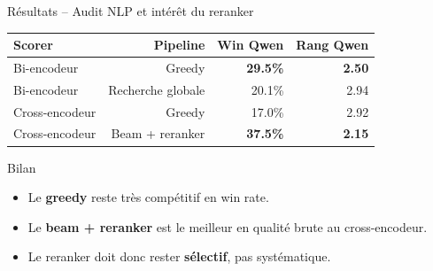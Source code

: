 \documentclass[11pt,aspectratio=169]{beamer}
\begin{document}
\begin{frame}{Résultats -- Audit NLP et intérêt du reranker}
\small
\begin{table}
\centering
\renewcommand{\arraystretch}{1.15}
\begin{tabular}{lrrr}
\toprule
\textbf{Scorer} & \textbf{Pipeline} & \textbf{Win Qwen} & \textbf{Rang Qwen} \\
\midrule
Bi-encodeur & Greedy & \textbf{29.5\%} & \textbf{2.50} \\
Bi-encodeur & Recherche globale & 20.1\% & 2.94 \\
Cross-encodeur & Greedy & 17.0\% & 2.92 \\
Cross-encodeur & Beam + reranker & \textbf{37.5\%} & \textbf{2.15} \\
\bottomrule
\end{tabular}
\end{table}

\vspace{0.25cm}

\begin{block}{Bilan}
\begin{itemize}
    \item Le \textbf{greedy} reste très compétitif en win rate.
    \item Le \textbf{beam + reranker} est le meilleur en qualité brute au cross-encodeur.
    \item Le reranker doit donc rester \textbf{sélectif}, pas systématique.
\end{itemize}
\end{block}
\end{frame}
\end{document}
